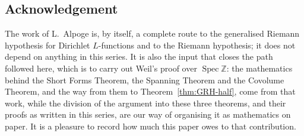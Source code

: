 \documentclass[10pt]{amsart}
\theoremstyle{definition}
\theoremstyle{remark}
\begin{document}
\subsection*{Acknowledgement}
The work of L.~Alpoge \cite{CharacterFamily} is, by itself, a complete route
to the generalised Riemann hypothesis for Dirichlet $L$-functions and to the
Riemann hypothesis; it does not depend on anything in this series. It is also
the input that closes the path followed here, which is to carry out Weil's
proof over $\operatorname{Spec}\mathbb Z$: the mathematics behind the Short
Forms Theorem, the Spanning Theorem and the Covolume Theorem, and the way from
them to Theorem~\ref{thm:GRH-half}, come from that work, while the division of
the argument into these three theorems, and their proofs as written in this
series, are our way of organising it as mathematics on paper. It is a pleasure
to record how much this paper owes to that contribution.
\end{document}
